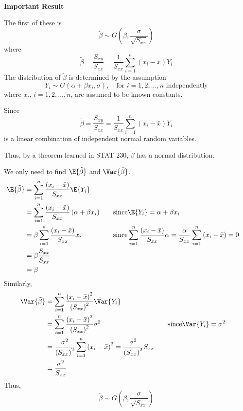 \documentclass[oneside]{book}
\begin{document}
\textbf{Important Result}

The first of these is
\[\tilde{\beta} \sim G\left(\beta, \frac{\sigma}{\sqrt{S_{x x}}}\right)\]
where
\[\tilde{\beta}=\frac{S_{x y}}{S_{x x}}=\frac{1}{S_{x x}} \sum_{i=1}^{n}\left(x_{i}-\bar{x}\right) Y_{i}\]
The distribution of $ \tilde{\beta} $ is determined by the assumption
\[Y_{i} \sim G\left(\alpha+\beta x_{i}, \sigma\right), \quad \text{for } i=1,2, \dots, n \text{ independently}\]
where $ x_i $, $ i=1,2,\ldots ,n $, are assumed to be known constants.

Since
\[\tilde{\beta}=\frac{S_{x y}}{S_{x x}}=\frac{1}{S_{x x}} \sum_{i=1}^{n}\left(x_{i}-\bar{x}\right) Y_{i}\]
is a linear combination of independent normal random variables.

Thus, by a theorem learned in STAT 230, $ \tilde{\beta} $ has a normal distribution.

We only need to find $ \E{\tilde{\beta}} $ and $ \Var{\tilde{\beta}} $.
\[\begin{aligned}
        \E{\tilde{\beta}}
         & =\sum_{i=1}^{n} \frac{\left(x_{i}-\bar{x}\right)}{S_{x x}} \E{Y_{i}}                                                                                                                                                                                \\
         & =\sum_{i=1}^{n} \frac{\left(x_{i}-\bar{x}\right)}{S_{x x}}\left(\alpha+\beta x_{i}\right) & \quad & \text{since} \E{Y_{i}}=\alpha+\beta x_{i}                                                                                                       \\
         & =\beta \sum_{i=1}^{n} \frac{\left(x_{i}-\bar{x}\right)}{S_{x x}} x_{i}                    &       & \text{since} \sum_{i=1}^{n} \frac{\left(x_{i}-\bar{x}\right)}{S_{x x}} \alpha=\frac{\alpha}{S_{x x}} \sum_{i=1}^{n}\left(x_{i}-\bar{x}\right)=0 \\
         & =\beta \frac{S_{x x}}{S_{x x}}                                                                                                                                                                                                                      \\
         & =\beta
    \end{aligned}
\]
Similarly,
\[\begin{aligned}
        \Var{\tilde{\beta}}
         & =\sum_{i=1}^{n} \frac{\left(x_{i}-\bar{x}\right)^{2}}{\left(S_{x x}\right)^{2}} \Var{Y_{i}}                                                                                                 \\
         & =\sum_{i=1}^{n} \frac{\left(x_{i}-\bar{x}\right)^{2}}{\left(S_{x x}\right)^{2}} \sigma^{2}                                                    & \quad & \text{since} \Var{Y_{i}}=\sigma^{2} \\
         & =\frac{\sigma^{2}}{\left(S_{x x}\right)^{2}} \sum_{i=1}^{n}\left(x_{i}-\bar{x}\right)^{2}=\frac{\sigma^{2}}{\left(S_{x x}\right)^{2}} S_{x x}                                               \\
         & =\frac{\sigma^{2}}{S_{x x}}
    \end{aligned}\]
Thus,
\[\tilde{\beta} \sim G\left(\beta, \frac{\sigma}{\sqrt{S_{x x}}}\right)\]
\end{document}
